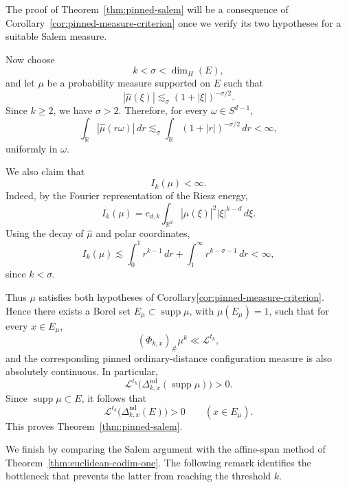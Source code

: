 \documentclass[11pt]{article}
\theoremstyle{remark}
\newcommand{\R}{\mathbb R}
\newcommand{\cL}{\mathcal L}
\newcommand{\supp}{\operatorname{supp}}
\numberwithin{equation}{section}
\newcommand{\1}{\mathbf 1}
\begin{document}
The proof of Theorem~\ref{thm:pinned-salem} will be a consequence of
Corollary~\ref{cor:pinned-measure-criterion} once we verify its two hypotheses for a suitable Salem measure.

Now choose
\[
k<\sigma<\dim_H(E),
\]
and let $\mu$ be a probability measure supported on $E$ such that
\[
|\widehat{\mu}(\xi)|
\lesssim_\sigma
(1+|\xi|)^{-\sigma/2}.
\]
Since $k\ge 2$, we have $\sigma>2$. Therefore, for every
$\omega\in S^{d-1}$,
\[
\int_{\R}
|\widehat{\mu}(r\omega)|\,dr
\lesssim_\sigma
\int_{\R}
(1+|r|)^{-\sigma/2}\,dr
<\infty,
\]
uniformly in $\omega$.

We also claim that
\[
I_k(\mu)<\infty.
\]
Indeed, by the Fourier representation of the Riesz energy,
\[
I_k(\mu)
=
c_{d,k}
\int_{\R^d}
|\widehat{\mu}(\xi)|^2
|\xi|^{k-d}\,d\xi.
\]
Using the decay of $\widehat{\mu}$ and polar coordinates,
\[
I_k(\mu)
\lesssim
\int_0^1 r^{k-1}\,dr
+
\int_1^\infty r^{k-\sigma-1}\,dr
<\infty,
\]
since $k<\sigma$.

Thus $\mu$ satisfies both hypotheses of
Corollary\ref{cor:pinned-measure-criterion}. Hence there exists a Borel set
$E_\mu\subset\supp\mu$, with $\mu(E_\mu)=1$, such that for every
$x\in E_\mu$,
\[
(\Phi_{k,x})_\#\mu^k\ll\cL^{t_k},
\]
and the corresponding pinned ordinary-distance configuration measure
is also absolutely continuous. In particular,
\[
\cL^{t_k}
\bigl(
\Delta_{k,x}^{\mathrm{nd}}(\supp\mu)
\bigr)
>0.
\]
Since $\supp\mu\subset E$, it follows that
\[
\cL^{t_k}
\bigl(
\Delta_{k,x}^{\mathrm{nd}}(E)
\bigr)
>0
\qquad
(x\in E_\mu).
\]
This proves Theorem~\ref{thm:pinned-salem}.

We finish by comparing the Salem argument with the affine-span method of
Theorem~\ref{thm:euclidean-codim-one}.  The following remark identifies
the bottleneck that prevents the latter from reaching the threshold $k$.
\end{document}
